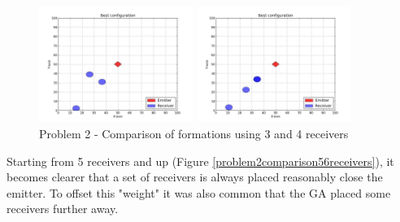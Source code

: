 \documentclass[10pt,a4paper]{book}
\begin{document}
\begin{figure}[H]
\begin{minipage}{50mm}
\end{minipage}
\begin{minipage}{50mm}
  \centering
  \includegraphics[width=50mm]{Problem2NoRotateRecv3_3.jpg}
\end{minipage} 
\begin{minipage}{50mm}
  \centering
  \includegraphics[width=50mm]{Problem2NoRotateRecv4_3.jpg}
\end{minipage}
\caption{Problem 2 - Comparison of formations using 3 and 4 receivers}
\label{problem2comparison34receivers}
\end{figure}


\newpage
Starting from 5 receivers and up (Figure \ref{problem2comparison56receivers}), it becomes clearer that a set of receivers is always placed reasonably close the emitter. To offset this "weight" it was also common that the \gls{GA} placed some receivers further away. 
\end{document}
